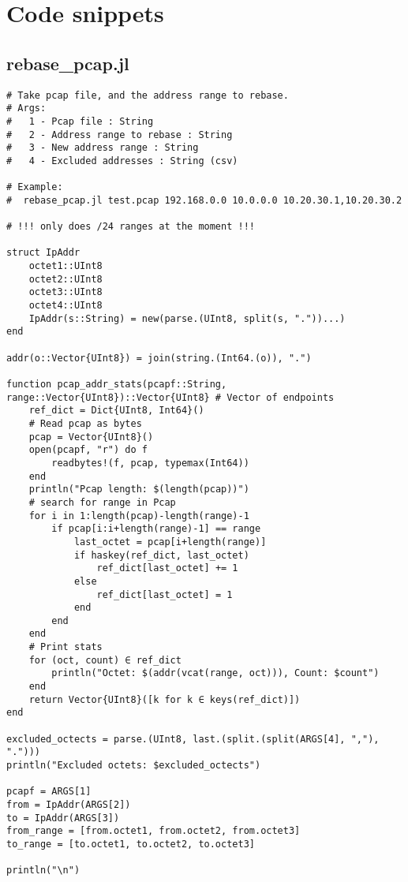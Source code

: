 \chapter{Code snippets}

\section{rebase\_pcap.jl}
\label{sec:apdx_rebase_jl}

\begin{lstlisting}[language=JuliaLocal, style=julia]
# Take pcap file, and the address range to rebase.
# Args:
#   1 - Pcap file : String
#   2 - Address range to rebase : String
#   3 - New address range : String
#   4 - Excluded addresses : String (csv)

# Example:
#  rebase_pcap.jl test.pcap 192.168.0.0 10.0.0.0 10.20.30.1,10.20.30.2

# !!! only does /24 ranges at the moment !!!

struct IpAddr
    octet1::UInt8
    octet2::UInt8
    octet3::UInt8
    octet4::UInt8
    IpAddr(s::String) = new(parse.(UInt8, split(s, "."))...)
end

addr(o::Vector{UInt8}) = join(string.(Int64.(o)), ".")

function pcap_addr_stats(pcapf::String, range::Vector{UInt8})::Vector{UInt8} # Vector of endpoints
    ref_dict = Dict{UInt8, Int64}()
    # Read pcap as bytes
    pcap = Vector{UInt8}()
    open(pcapf, "r") do f
        readbytes!(f, pcap, typemax(Int64))
    end
    println("Pcap length: $(length(pcap))")
    # search for range in Pcap
    for i in 1:length(pcap)-length(range)-1
        if pcap[i:i+length(range)-1] == range
            last_octet = pcap[i+length(range)]
            if haskey(ref_dict, last_octet)
                ref_dict[last_octet] += 1
            else
                ref_dict[last_octet] = 1
            end
        end
    end
    # Print stats
    for (oct, count) ∈ ref_dict
        println("Octet: $(addr(vcat(range, oct))), Count: $count")
    end
    return Vector{UInt8}([k for k ∈ keys(ref_dict)])
end

excluded_octects = parse.(UInt8, last.(split.(split(ARGS[4], ","), ".")))
println("Excluded octets: $excluded_octects")

pcapf = ARGS[1]
from = IpAddr(ARGS[2])
to = IpAddr(ARGS[3])
from_range = [from.octet1, from.octet2, from.octet3]
to_range = [to.octet1, to.octet2, to.octet3]

println("\n")


\end{lstlisting}
